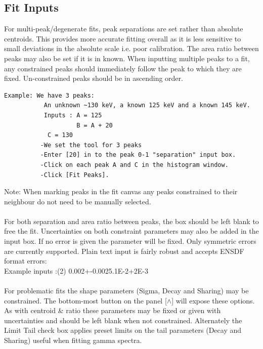 \documentclass[a4paper,10pt]{article}
\begin{document}
\subsection{Fit Inputs}
For multi-peak/degenerate fits, peak separations are set rather than absolute centroids. This provides more accurate fitting overall as it is less sensitive to small deviations in the absolute scale i.e. poor calibration. The area ratio between peaks may also be set if it is in known. When inputting multiple peaks to a fit, any constrained peaks should immediately follow the peak to which they are fixed. Un-constrained peaks should be in ascending order.
\begin{lstlisting}
Example: We have 3 peaks:
           An unknown ~130 keV, a known 125 keV and a known 145 keV.
           Inputs : A = 125
                    B = A + 20
		    C = 130
          -We set the tool for 3 peaks
          -Enter [20] in to the peak 0-1 "separation" input box.
          -Click on each peak A and C in the histogram window.
          -Click [Fit Peaks].
\end{lstlisting}
Note: When marking peaks in the fit canvas any peaks constrained to their neighbour do not need to be manually selected.
\\
\\
For both separation and area ratio between peaks, the box should be left blank to free the fit. Uncertainties on both constraint parameters may also be added in the input box. If no error is given the parameter will be fixed. Only symmetric errors are currently supported. Plain text input is fairly robust and accepts ENSDF format errors:\\
Example inputs :(2) 0.002+-0.002\qquad5.1E-2+2E-3
\label{sec:errors}
\\
\\
For problematic fits the shape parameters (Sigma, Decay and Sharing) may be constrained. The bottom-most button on the panel [$\wedge$] will expose these options. As with centroid \& ratio these parameters may be fixed or given with uncertainties and should be left blank when not constrained.
Alternately the Limit Tail check box applies preset limits on the tail parameters (Decay and Sharing) useful when fitting gamma spectra.
\end{document}
